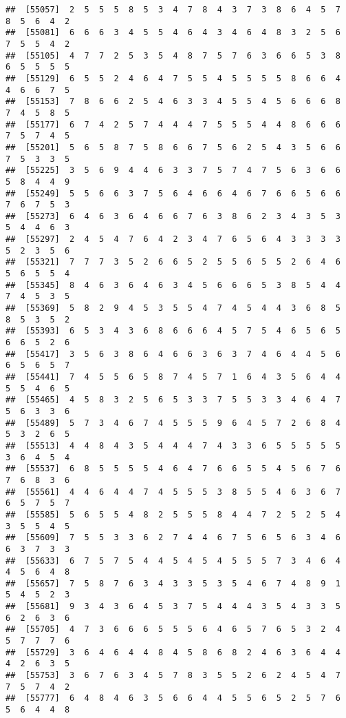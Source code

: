 \documentclass[
]{book}
\begin{document}
\begin{verbatim}
##  [55057]  2  5  5  5  8  5  3  4  7  8  4  3  7  3  8  6  4  5  7  8  5  6  4  2
##  [55081]  6  6  6  3  4  5  5  4  6  4  3  4  6  4  8  3  2  5  6  7  5  5  4  2
##  [55105]  4  7  7  2  5  3  5  4  8  7  5  7  6  3  6  6  5  3  8  6  5  5  5  5
##  [55129]  6  5  5  2  4  6  4  7  5  5  4  5  5  5  5  8  6  6  4  4  6  6  7  5
##  [55153]  7  8  6  6  2  5  4  6  3  3  4  5  5  4  5  6  6  6  8  7  4  5  8  5
##  [55177]  6  7  4  2  5  7  4  4  4  7  5  5  5  4  4  8  6  6  6  7  5  7  4  5
##  [55201]  5  6  5  8  7  5  8  6  6  7  5  6  2  5  4  3  5  6  6  7  5  3  3  5
##  [55225]  3  5  6  9  4  4  6  3  3  7  5  7  4  7  5  6  3  6  6  5  8  4  4  9
##  [55249]  5  5  6  6  3  7  5  6  4  6  6  4  6  7  6  6  5  6  6  7  6  7  5  3
##  [55273]  6  4  6  3  6  4  6  6  7  6  3  8  6  2  3  4  3  5  3  5  4  4  6  3
##  [55297]  2  4  5  4  7  6  4  2  3  4  7  6  5  6  4  3  3  3  3  5  2  3  5  6
##  [55321]  7  7  7  3  5  2  6  6  5  2  5  5  6  5  5  2  6  4  6  5  6  5  5  4
##  [55345]  8  4  6  3  6  4  6  3  4  5  6  6  6  5  3  8  5  4  4  7  4  5  3  5
##  [55369]  5  8  2  9  4  5  3  5  5  4  7  4  5  4  4  3  6  8  5  8  5  3  5  2
##  [55393]  6  5  3  4  3  6  8  6  6  6  4  5  7  5  4  6  5  6  5  6  6  5  2  6
##  [55417]  3  5  6  3  8  6  4  6  6  3  6  3  7  4  6  4  4  5  6  6  5  6  5  7
##  [55441]  7  4  5  5  6  5  8  7  4  5  7  1  6  4  3  5  6  4  4  5  5  4  6  5
##  [55465]  4  5  8  3  2  5  6  5  3  3  7  5  5  3  3  4  6  4  7  5  6  3  3  6
##  [55489]  5  7  3  4  6  7  4  5  5  5  9  6  4  5  7  2  6  8  4  5  3  2  6  5
##  [55513]  4  4  8  4  3  5  4  4  4  7  4  3  3  6  5  5  5  5  5  3  6  4  5  4
##  [55537]  6  8  5  5  5  5  4  6  4  7  6  6  5  5  4  5  6  7  6  7  6  8  3  6
##  [55561]  4  4  6  4  4  7  4  5  5  5  3  8  5  5  4  6  3  6  7  6  5  7  5  7
##  [55585]  5  6  5  5  4  8  2  5  5  5  8  4  4  7  2  5  2  5  4  3  5  5  4  5
##  [55609]  7  5  5  3  3  6  2  7  4  4  6  7  5  6  5  6  3  4  6  6  3  7  3  3
##  [55633]  6  7  5  7  5  4  4  5  4  5  4  5  5  5  7  3  4  6  4  4  5  6  4  8
##  [55657]  7  5  8  7  6  3  4  3  3  5  3  5  4  6  7  4  8  9  1  5  4  5  2  3
##  [55681]  9  3  4  3  6  4  5  3  7  5  4  4  4  3  5  4  3  3  5  6  2  6  3  6
##  [55705]  4  7  3  6  6  6  5  5  5  6  4  6  5  7  6  5  3  2  4  5  7  7  7  6
##  [55729]  3  6  4  6  4  4  8  4  5  8  6  8  2  4  6  3  6  4  4  4  2  6  3  5
##  [55753]  3  6  7  6  3  4  5  7  8  3  5  5  2  6  2  4  5  4  7  7  5  7  4  2
##  [55777]  6  4  8  4  6  3  5  6  6  4  4  5  5  6  5  2  5  7  6  5  6  4  4  8

\end{verbatim}
\end{document}
